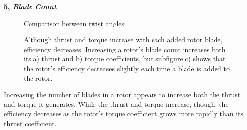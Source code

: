 \documentclass{article}
\begin{document}
\textbf{5, \emph{Blade Count}} \newline

\begin{figure}
  \centering
  \caption{Comparison between twist angles}
  \captionsetup{aboveskip=0pt,font=it}
  \caption*{Although thrust and torque increase with each added rotor blade, efficiency decreases. Increasing a rotor's blade count increases both its a) thrust and b) torque coefficients, but subfigure c) shows that the rotor's efficiency decreases slightly each time a blade is added to the rotor.}
  \label{fig:7}
\end{figure}

Increasing the number of blades in a rotor appears to increase both the thrust and torque it generates. While the thrust and torque increase, though, the efficiency decreases as the rotor's torque coefficient grows more rapidly than its thrust coefficient.

\clearpage
\end{document}
